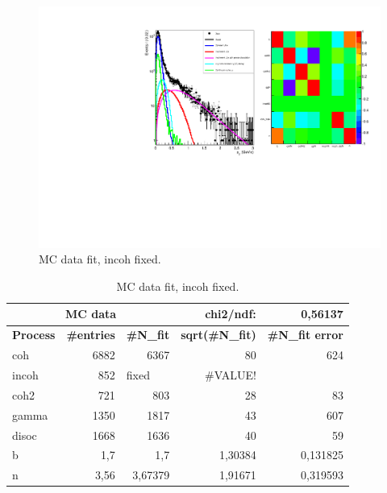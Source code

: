 \documentclass{beamer}
\begin{document}
\begin{frame}

\begin{figure}[!ht]
\centering
 {\includegraphics[width=\textwidth]{1Pt_fit.pdf}
\caption{MC data fit, incoh fixed.} 
\label{fig:}}
\end{figure}

\end{frame}
\begin{frame}

\begin{table}[!hb]
\begin{center}
\begin{tabular}{|l|r|r|r|r|}
\hline
\multicolumn{3}{|c|}{\textbf{MC data}} & chi2/ndf: & 0,56137 \\ \hline
\textbf{Process} & \multicolumn{1}{l|}{\textbf{\#entries}} & \multicolumn{1}{l|}{\textbf{\#N\_fit}} & \multicolumn{1}{l|}{\textbf{sqrt(\#N\_fit)}} & \multicolumn{1}{l|}{\textbf{\#N\_fit error}} \\ \hline
coh & 6882 & 6367 & 80 & 624 \\ \hline
incoh & 852 & \multicolumn{1}{l|}{fixed} & \#VALUE! & \multicolumn{1}{l|}{} \\ \hline
coh2 & 721 & 803 & 28 & 83 \\ \hline
gamma & 1350 & 1817 & 43 & 607 \\ \hline
disoc & 1668 & 1636 & 40 & 59 \\ \hline
b & 1,7 & 1,7 & 1,30384 & 0,131825 \\ \hline
n & 3,56 & 3,67379 & 1,91671 & 0,319593 \\ \hline
\end{tabular}
\end{center}
\caption{MC data fit, incoh fixed.}
\label{}
\end{table}

\end{frame}
\end{document}
